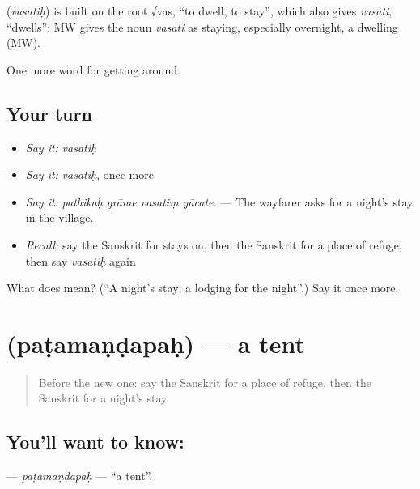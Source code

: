 \begin{cousinweb}
\textbf{} (\emph{vasatiḥ}) is built on the root √vas, \textquotedblleft{}to dwell, to stay\textquotedblright{}, which also gives \emph{vasati}, \textquotedblleft{}dwells\textquotedblright{}; MW gives the noun \emph{vasati} as staying, especially overnight, a dwelling (MW).
\end{cousinweb}

\begin{grammarlens}[title={What you've built}]
One more word for getting around.
\end{grammarlens}

\subsection*{Your turn}
\begin{itemize}
\raggedright
  \item \emph{Say it:} \emph{vasatiḥ}
  \item \emph{Say it:} \emph{vasatiḥ}, once more
  \item \emph{Say it:} \emph{pathikaḥ grāme vasatiṃ yācate.} — The wayfarer asks for a night's stay in the village.
  \item \emph{Recall:} say the Sanskrit for stays on, then the Sanskrit for a place of refuge, then say \emph{vasatiḥ} again
\end{itemize}

\begin{tcolorbox}[breakable,colback=teal!4,colframe=teal!35!black,title={Before you move on}]
What does  mean? (\textquotedblleft{}A night's stay; a lodging for the night\textquotedblright{}.) Say it once more.
\end{tcolorbox}
\section[\texorpdfstring{\sk{पटमण्डपः} (paṭamaṇḍapaḥ)}{पटमण्डपः (paṭamaṇḍapaḥ)}]{ (paṭamaṇḍapaḥ) — a tent}

\label{lesson:SA-C427-patamandapah}



\begin{quote}
Before the new one: say the Sanskrit for a place of refuge, then the Sanskrit for a night's stay.
\end{quote}

\subsection*{You'll want to know: }
\textbf{} — \emph{paṭamaṇḍapaḥ} — \textquotedblleft{}a tent\textquotedblright{}.

